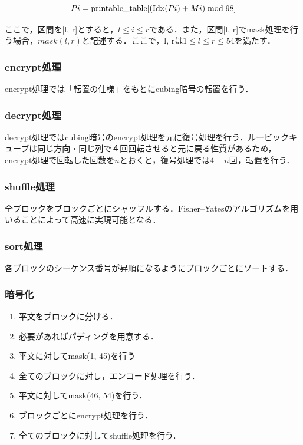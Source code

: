 \documentclass[a4p]{jarticle}
\begin{document}
\[Pi=\mathrm{printable\_table}[(\mathrm{Idx}(Pi)+Mi) \bmod 98]\\\]

ここで，区間を[l, r]とすると，\(l\leq i \leq r\)である．また，区間[l, r]でmask処理を行う場合，\(mask(l, r)\)と記述する．ここで，l, rは\(1 \leq l \leq r \leq 54\)を満たす．

\subsubsection{encrypt処理}
encrypt処理では「転置の仕様」をもとにcubing暗号の転置を行う．

\subsubsection{decrypt処理}
decrypt処理ではcubing暗号のencrypt処理を元に復号処理を行う．ルービックキューブは同じ方向・同じ列で４回回転させると元に戻る性質があるため，encrypt処理で回転した回数を\(n\)とおくと，復号処理では\(4-n\)回，転置を行う．

\subsubsection{shuffle処理}
全ブロックをブロックごとにシャッフルする．Fisher–Yatesのアルゴリズムを用いることによって高速に実現可能となる．

\subsubsection{sort処理}
各ブロックのシーケンス番号が昇順になるようにブロックごとにソートする．

\subsubsection{暗号化}
\begin{enumerate}
\item 平文をブロックに分ける．
\item 必要があればパディングを用意する．
\item 平文に対してmask(1, 45)を行う
\item 全てのブロックに対し，エンコード処理を行う．
\item 平文に対してmask(46, 54)を行う．
\item ブロックごとにencrypt処理を行う．
\item 全てのブロックに対してshuffle処理を行う．
\end{enumerate}
\end{document}
